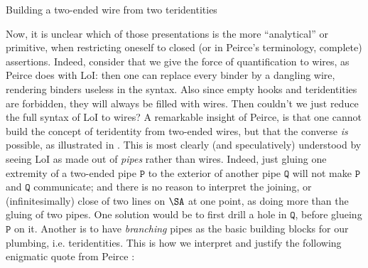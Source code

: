 \begin{scope}
\begin{marginfigure}
  \begin{center}
  \end{center}
  \caption{Building a two-ended wire from two teridentities}
\end{marginfigure}

Now, it is unclear which of those presentations is the more ``analytical'' or
primitive, when restricting oneself to closed (or in Peirce's terminology,
complete) assertions. Indeed, consider that we give the force of quantification
to wires, as Peirce does with LoI: then one can replace every binder by a
dangling wire, rendering binders useless in the syntax. Also since empty hooks
and teridentities are forbidden, they will always be filled with wires. Then
couldn't we just reduce the full syntax of LoI to wires? A remarkable insight of
Peirce, is that one cannot build the concept of teridentity from two-ended
wires, but that the converse \emph{is} possible, as illustrated in
. This is most clearly (and speculatively) understood
by seeing LoI as made out of \emph{pipes} rather than wires. Indeed, just gluing
one extremity of a two-ended pipe $\mathtt{P}$ to the exterior of another pipe
$\mathtt{Q}$ will not make $\mathtt{P}$ and $\mathtt{Q}$ communicate; and there
is no reason to interpret the joining, or (infinitesimally) close 
of two lines on $\SA$ at one point, as doing more than the gluing of two
pipes. One
solution would be to first drill a hole in $\mathtt{Q}$, before glueing
$\mathtt{P}$ on it. Another is to have \emph{branching} pipes as the basic
building blocks for our plumbing, i.e. teridentities. This is how we interpret
and justify  the following enigmatic quote from Peirce
\cite[p.~116]{Roberts+1973}:


\end{scope}
